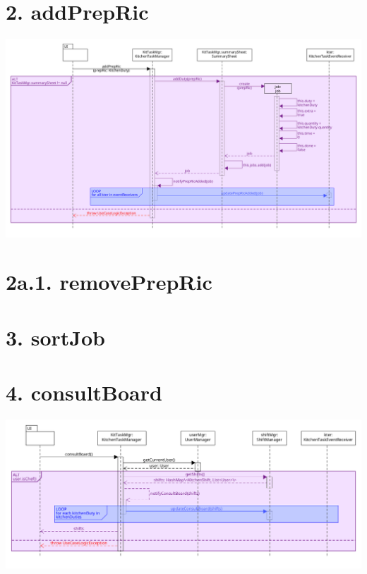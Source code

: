 \pagebreak

\section*{2. addPrepRic}

\begin{center}
  \includegraphics[scale = 0.32]{images/DSD/DSD 2.png}
\end{center}

\pagebreak

\section*{2a.1. removePrepRic}

\pagebreak

\section*{3. sortJob}

\pagebreak

\section*{4. consultBoard}

\begin{center}
  \includegraphics[scale = 0.38]{images/DSD/DSD 4.png}
\end{center}

